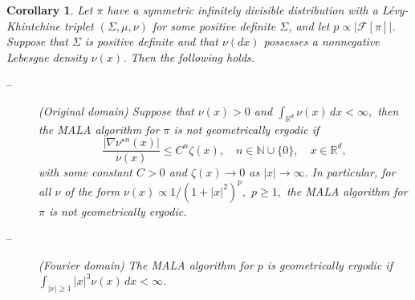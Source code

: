 \documentclass[preprint, 3p, authoryear]{elsarticle}
\newcommand{\R}{\mathbb R}
\newtheorem{corollary}{Corollary}
\theoremstyle{definition}
\begin{document}
\begin{corollary}
	Let $\pi$ have a symmetric infinitely divisible distribution with a L\'evy-Khintchine triplet $\left(\Sigma,\mu,\nu\right)$ for some positive definite $\Sigma$,
	and let $p \propto |\mathcal{F}[\pi]|$.
	Suppose that $\Sigma$ is positive definite and 
	that $\nu(dx)$ possesses a nonnegative Lebesgue density $\nu(x)$.
	Then the following holds.
\begin{description}
	\item[--] (Original domain) Suppose that $\nu(x)>0$ and $\int_{\R^d} \nu (x)\, dx <\infty,$ then the MALA algorithm for $\pi$ is not geometrically ergodic if 
	\[
	\frac{|\nabla\nu^{\star n}(x)|}{\nu(x)}\leq C^n \zeta (x), \quad n\in \mathbb{N}\cup \{0\}, \quad x\in \mathbb{R}^d,
	\] 
	with some constant $C>0$ and $\zeta (x)\to 0$ as $|x|\to \infty.$ In particular, for all $\nu$ of the form $\nu(x)\propto 1/(1+|x|^2)^p,$ $p\geq 1,$ the MALA algorithm for $\pi$ is not geometrically ergodic.
	\item[--] (Fourier domain) The MALA algorithm for $p$ is geometrically ergodic if \(\int_{|x|\geq 1} |x|^3 \nu(x)\,dx<\infty\). 
\end{description}
\end{corollary}
\end{document}
